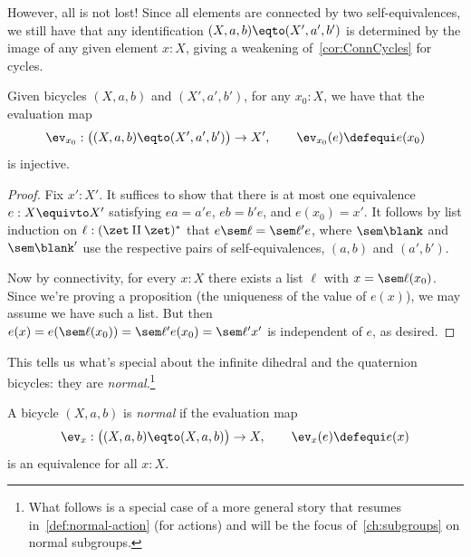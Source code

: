 \begin{marginfigure}
  \noindent{}
  \caption{Another ``abnormal'' bicycle: It has four elements,
  but only two symmetries.}
  \label{fig:somewhat-abnormal-bicycle}
\end{marginfigure}

However, all is not lost! Since all elements are connected by two
self-equivalences, we still have that any identification
$(X,a,b) \eqto (X',a',b')$ is determined by the image of any given
element $x:X$, giving a weakening of~\cref{cor:ConnCycles} for cycles.
\begin{lemma}\label{lem:evisinj-bicycle}
  Given bicycles $(X,a,b)$ and $(X',a',b')$,
  for any $x_0:X$, we have that the evaluation map
  \[
    \ev_{x_0}: \bigl((X,a,b) \eqto (X',a',b')\bigr) \to X',
    \qquad \ev_{x_0}(e)\defequi e(x_0)
  \]
  is injective.
\end{lemma}
\begin{proof}
  Fix $x':X'$. It suffices to show that there is at most one equivalence
  $e : X\equivto X'$ satisfying $ea=a'e$, $eb=b'e$, and $e(x_0) = x'$.
  It follows by list induction on $\ell:(\zet\amalg\zet)^*$
  that $e \sem\ell = \sem\ell' e$, where $\sem\blank$ and $\sem\blank'$
  use the respective pairs of self-equivalences, $(a,b)$ and $(a',b')$.

  Now by connectivity, for every $x:X$ there exists a list $\ell$
  with $x = \sem\ell(x_0)$. Since we're proving a proposition
  (the uniqueness of the value of $e(x)$), we may assume we have such a list.
  But then $e(x) = e(\sem\ell(x_0)) = \sem\ell' e(x_0) = \sem\ell' x'$
  is independent of $e$, as desired.
\end{proof}
This tells us what's special about the infinite dihedral
and the quaternion bicycles: they are \emph{normal}.\footnote{%
  What follows is a special case of a more general story
  that resumes in~\cref{def:normal-action} (for actions)
  and will be the focus of~\cref{ch:subgroups}
  on normal subgroups.}
\begin{definition}\label{def:normal-bicycle}
  A bicycle $(X,a,b)$ is \emph{normal} if the evaluation
  map
  \[
    \ev_x: \bigl((X,a,b) \eqto (X,a,b)\bigr) \to X,
    \qquad \ev_{x}(e)\defequi e(x)
  \]
  is an equivalence for all $x:X$.
\end{definition}
